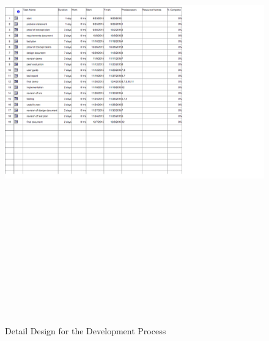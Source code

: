 \documentclass[titlepage]{article}
\begin{document}
\begin{figure}
	\includegraphics[width=25cm, height=20cm]{detaildesign}
	\caption{Detail Design for the Development Process}
	\label{fig:Detail Design for the Development Process}
\end{figure}
\end{document}
